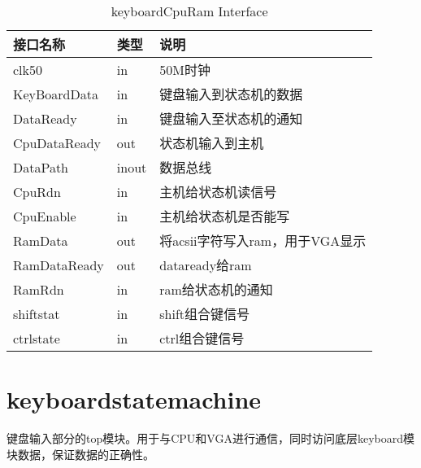 \begin{table}[H]
\begin{center}
\renewcommand{\arraystretch}{1.3}
\small
\caption{keyboardCpuRam Interface}
\label{tab:treatments}
\begin{tabular}{|p{3cm}<{\centering}|p{1.4cm}<{\centering}|p{7cm}<{\centering}|}
\hline
接口名称 & 类型 & 说明 \\
\hline
clk50 & in & 50M时钟 \\
\hline
KeyBoardData & in & 键盘输入到状态机的数据 \\
\hline
DataReady & in & 键盘输入至状态机的通知 \\
\hline
CpuDataReady & out & 状态机输入到主机 \\
\hline
DataPath & inout & 数据总线 \\
\hline
CpuRdn & in & 主机给状态机读信号 \\
\hline
CpuEnable & in & 主机给状态机是否能写\\
\hline
RamData & out & 将acsii字符写入ram，用于VGA显示\\
\hline
RamDataReady & out & dataready给ram \\
\hline
RamRdn & in & ram给状态机的通知 \\
\hline
 shiftstat & in & shift组合键信号 \\
 \hline
 ctrlstate & in & ctrl组合键信号 \\
 \hline
\end{tabular}
\end{center}
\end{table}


\section{keyboardstatemachine}

键盘输入部分的top模块。用于与CPU和VGA进行通信，同时访问底层keyboard模块数据，保证数据的正确性。

